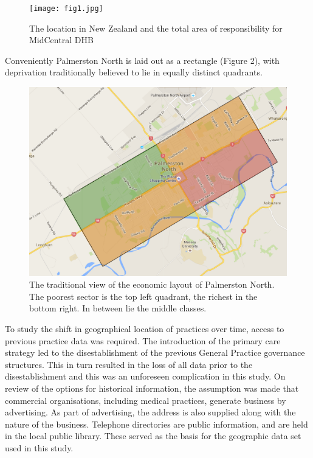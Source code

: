 \documentclass[11pt,a4paper]{article}
\begin{document}
\begin{figure}[htp]
\centering
\texttt{[image: fig1.jpg]}
\caption{The location in New Zealand and the total area of responsibility for MidCentral DHB}
\label{MidCentral District Health Board}
\end{figure}

Conveniently Palmerston North is laid out as a rectangle (Figure 2), with deprivation traditionally believed to lie in equally distinct quadrants.\\

\begin{figure}[htp]
\centering
\includegraphics[scale=0.20]{fig2.png}
\caption{The traditional view of the economic layout of Palmerston North. The poorest sector is the top left quadrant, the richest in the bottom right. In between lie the middle classes.}
\label{Traditional view of the spatial economics of Palmerston North City}
\end{figure}

To study the shift in geographical location of practices over time, access to previous practice data was required. The introduction of the primary care strategy led to the disestablishment of the previous General Practice governance structures. This in turn resulted in the loss of all data prior to the disestablishment and this was an unforeseen complication in this study. On review of the options for historical information, the assumption was made that commercial organisations, including medical practices, generate business by advertising. As part of advertising, the address is also supplied along with the nature of the business. Telephone directories are public information, and are held in the local public library. These served as the basis for the geographic data set used in this study.\\
\end{document}
